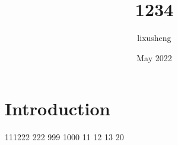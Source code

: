 \documentclass{article}
\title{1234}
\author{lixusheng }
\date{May 2022}
\begin{document}
\maketitle

\section{Introduction}
111222
222
999
1000
11
12
13
20
\end{document}
